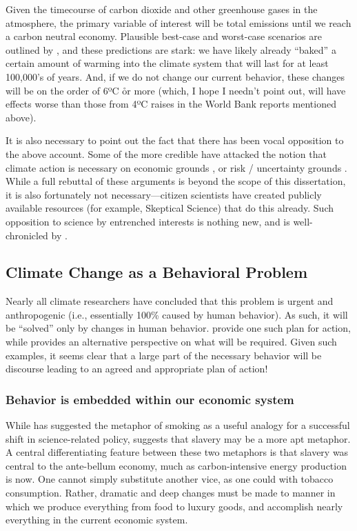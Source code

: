 Given the timecourse of carbon dioxide and other greenhouse gases in the
atmosphere, the primary variable of interest will be total emissions until we
reach a carbon neutral economy. Plausible best-case and worst-case scenarios are
outlined by \textcite{archer_millennial_2008}, and these predictions are stark:
we have likely already “baked” a certain amount of warming into the climate
system that will last for at least 100,000's of years. And, if we do not change
our current behavior, these changes will be on the order of 6ºC o̊r more (which, I
hope I needn't point out, will have effects worse than those from 4ºC raises in
the World Bank reports mentioned above).

It is also necessary to point out the fact that there has been vocal opposition
to the above account. Some of the more credible have attacked the notion that
climate action is necessary on economic grounds \parencite[e.g.,][]{lomberg}, or
risk / uncertainty grounds \parencite[e.g.,][]{muller}. While a full rebuttal of
these arguments is beyond the scope of this dissertation, it is also fortunately
not necessary---citizen scientists have created publicly available resources
(for example, Skeptical Science) that do this already. Such opposition to
science by entrenched interests is nothing new, and is well-chronicled by
\textcite{oreskes_merchants_2010}.

\subsection{Climate Change as a Behavioral Problem}

Nearly all climate researchers have concluded that this problem is urgent and
anthropogenic (i.e., essentially 100\% caused by human behavior). As such, it
will be ``solved'' only by changes in human behavior. \textcite{harte_cool_2008}
provide one such plan for action, while \textcite{schrag} provides an
alternative perspective on what will be required. Given such examples, it seems
clear that a large part of the necessary behavior will be discourse leading to
an agreed and appropriate plan of action! 

\subsubsection{Behavior is embedded within our economic system}

While \textcite{hoffman_climate_2010} has suggested the metaphor of smoking as a useful
analogy for a successful shift in science-related policy, \textcite{schrag}
suggests that slavery may be a more apt metaphor. A central differentiating
feature between these two metaphors is that slavery was central to the
ante-bellum economy, much as carbon-intensive energy production is now. One
cannot simply substitute another vice, as one could with tobacco consumption.
Rather, dramatic and deep changes must be made to manner in which we produce
everything from food to luxury goods, and accomplish nearly everything in the
current economic system.

